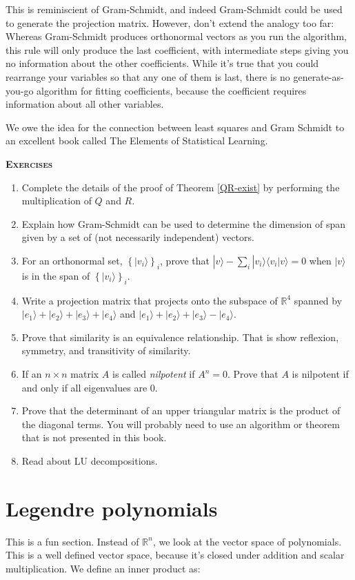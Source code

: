 \documentclass{amsbook}
\begin{document}
This is reminiscient of Gram-Schmidt, and indeed Gram-Schmidt could be used to generate the projection matrix.  However, don't extend the analogy too far:  Whereas Gram-Schmidt produces orthonormal vectors as you run the algorithm, this rule will only produce the last coefficient, with intermediate steps giving you no information about the other coefficients.  While it's true that you could rearrange your variables so that any one of them is last, there is no generate-as-you-go algorithm for fitting coefficients, because the coefficient requires information about all other variables.

We owe the idea for the connection between least squares and Gram Schmidt to an excellent book called The Elements of Statistical Learning.

{\bfseries\scshape\Large Exercises}

\begin{enumerate}
\item Complete the details of the proof of Theorem \ref{QR-exist} by performing the multiplication of $Q$ and $R$.
\item Explain how Gram-Schmidt can be used to determine the dimension of span given by a set of (not necessarily independent) vectors.
\item For an orthonormal set, $\left\{|v_i\rangle\right\}_i$, prove that $|v\rangle-\sum_i|v_i\rangle\langle v_i|v\rangle=0$ when $|v\rangle$ is in the span of $\left\{|v_i\rangle\right\}_i$.
\item Write a projection matrix that projects onto the subspace of $\mathbb R^4$ spanned by $|e_1\rangle+|e_2\rangle+|e_3\rangle+|e_4\rangle$ and $|e_1\rangle+|e_2\rangle+|e_3\rangle-|e_4\rangle$.
\item Prove that similarity is an equivalence relationship.  That is show reflexion, symmetry, and transitivity of similarity.
\item If an $n\times n$ matrix $A$ is called {\em nilpotent} if $A^n=0$.  Prove that $A$ is nilpotent if and only if all eigenvalues are $0$.
\item\label{determinant-ex} Prove that the determinant of an upper triangular matrix is the product of the diagonal terms.  You will probably need to use an algorithm or theorem that is not presented in this book.
\item Read about LU decompositions.
\end{enumerate}

\section{Legendre polynomials}
This is a fun section.  Instead of $\mathbb R^n$, we look at the vector space of polynomials.  This is a well defined vector space, because it's closed under addition and scalar multiplication.  We define an inner product as:
\end{document}
